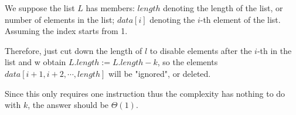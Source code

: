 \question
\begin{solution}
    We suppose the list $L$ has members: $length$ denoting the length of the list, or number of elements in the list; $data[i]$ denoting the $i$-th element of the list. Assuming the index starts from 1.

    Therefore, just cut down the length of $l$ to disable elements after the $i$-th in the list and w obtain $L.length := L.length-k$,
    so the elements $data[i+1, i+2, \cdots, length]$ will be "ignored", or deleted.

    Since this only requires one instruction thus the complexity has nothing to do with $k$, the answer should be $\Theta(1)$.
    
\end{solution}